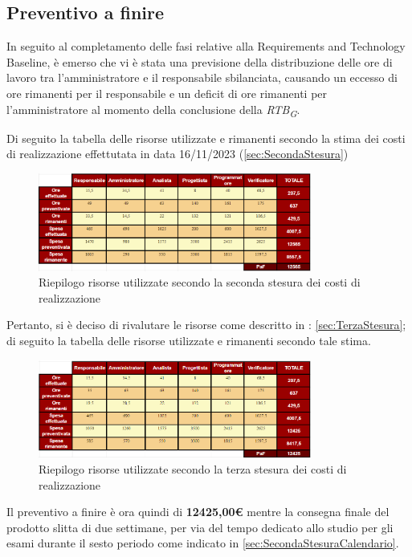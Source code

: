 \subsection{Preventivo a finire}
In seguito al completamento delle fasi relative alla Requirements and Technology Baseline, è emerso che vi è stata una previsione della distribuzione delle ore di lavoro tra l'amministratore e il responsabile sbilanciata, causando un eccesso di ore rimanenti per il responsabile e un deficit di ore rimanenti per l'amministratore al momento della conclusione della \textit{RTB}\textsubscript{\textit{G}}.

Di seguito la tabella delle risorse utilizzate e rimanenti secondo la stima dei costi di realizzazione effettutata in data 16/11/2023 (\ref{sec:SecondaStesura})
\begin{figure}[H]
    \centering
    \includegraphics[width=0.8\textwidth]{../Images/PaF1stesura.PNG}
    \caption{Riepilogo risorse utilizzate secondo la seconda stesura dei costi di realizzazione}
    \label{fig:RisorseRimanentiRTB}
\end{figure}

Pertanto, si è deciso di rivalutare le risorse come descritto in : \ref{sec:TerzaStesura};
di seguito la tabella delle risorse utilizzate e rimanenti secondo tale stima.

\begin{figure}[H]
    \centering
    \includegraphics[width=0.8\textwidth]{../Images/PaF2stesura.PNG}
    \caption{Riepilogo risorse utilizzate secondo la terza stesura dei costi di realizzazione}
    \label{fig:RisorseRimanentiRTB2}
\end{figure}
Il preventivo a finire è ora quindi di \textbf{12425,00€} mentre la consegna finale del prodotto slitta di due
settimane, per via del tempo dedicato allo studio per gli esami durante il sesto periodo come indicato in \ref{sec:SecondaStesuraCalendario}.

